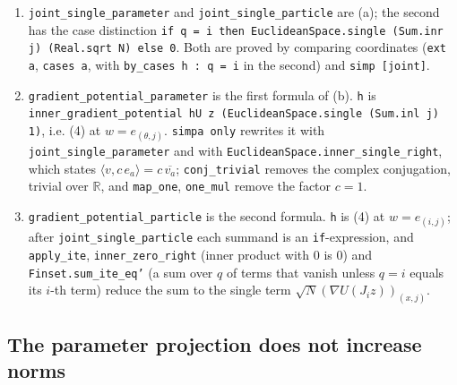 \documentclass[11pt,a4paper]{report}
\begin{document}
\begin{leanbox}
\begin{enumerate}


\item \texttt{joint\_\allowbreak{}single\_\allowbreak{}parameter} and \texttt{joint\_\allowbreak{}single\_\allowbreak{}particle} are (a); the second has the case distinction \texttt{if q = i then Euclidean\allowbreak{}Space.\allowbreak{}single (Sum.\allowbreak{}inr j) (Real.\allowbreak{}sqrt N) else 0}. Both are proved by comparing coordinates (\texttt{ext a}, \texttt{cases a}, with \texttt{by\_\allowbreak{}cases h : q = i} in the second) and \texttt{simp [joint]}.

\item \texttt{gradient\_\allowbreak{}potential\_\allowbreak{}parameter} is the first formula of (b). \texttt{h} is \texttt{inner\_\allowbreak{}gradient\_\allowbreak{}potential h\allowbreak{}U z (Euclidean\allowbreak{}Space.\allowbreak{}single (Sum.\allowbreak{}inl j) 1)}, i.e. (4) at \(w=e_{(\theta,j)}\). \texttt{simpa only} rewrites it with \texttt{joint\_\allowbreak{}single\_\allowbreak{}parameter} and with \texttt{Euclidean\allowbreak{}Space.\allowbreak{}inner\_\allowbreak{}single\_\allowbreak{}right}, which states \(\langle v,c\,e_a\rangle=c\,\overline{v_a}\); \texttt{conj\_\allowbreak{}trivial} removes the complex conjugation, trivial over \(\mathbb R\), and \texttt{map\_\allowbreak{}one}, \texttt{one\_\allowbreak{}mul} remove the factor \(c=1\).

\item \texttt{gradient\_\allowbreak{}potential\_\allowbreak{}particle} is the second formula. \texttt{h} is (4) at \(w=e_{(i,j)}\); after \texttt{joint\_\allowbreak{}single\_\allowbreak{}particle} each summand is an \texttt{if}-expression, and \texttt{apply\_\allowbreak{}ite}, \texttt{inner\_\allowbreak{}zero\_\allowbreak{}right} (inner product with \(0\) is \(0\)) and \texttt{Finset.\allowbreak{}sum\_\allowbreak{}ite\_\allowbreak{}eq'} (a sum over \(q\) of terms that vanish unless \(q=i\) equals its \(i\)-th term) reduce the sum to the single term \(\sqrt N(\nabla U(J_iz))_{(x,j)}\).

\end{enumerate}
\end{leanbox}
\subsection{\texorpdfstring{The parameter projection does not increase norms}{The parameter projection does not increase norms}}
\label{report-step-IPLA-Geometry-lean-6}
\end{document}
